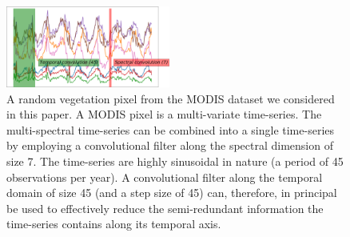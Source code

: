 \documentclass{article}
\begin{document}
\begin{figure}
  \includegraphics[width=0.48\textwidth]{time_series-crop.pdf}
  \caption{A random vegetation pixel from the MODIS dataset we considered in this paper. A MODIS pixel is a multi-variate time-series. The multi-spectral time-series can be combined into a single time-series by employing a convolutional filter along the spectral dimension of size 7. The time-series are highly sinusoidal in nature (a period of 45 observations per year). A convolutional filter along the temporal domain of size 45 (and a step size of 45) can, therefore, in principal be used to effectively reduce the semi-redundant information the time-series contains along its temporal axis.}
 \label{fig:mv_series} 
 \end{figure}
 
\end{document}
